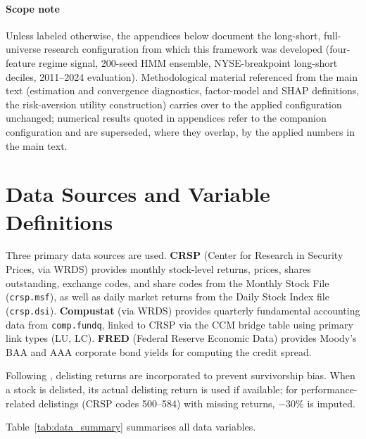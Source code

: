 
\paragraph*{Scope note}
Unless labeled otherwise, the appendices below document the long-short, full-universe research configuration from which this framework was developed (four-feature regime signal, 200-seed HMM ensemble, NYSE-breakpoint long-short deciles, 2011--2024 evaluation). Methodological material referenced from the main text (estimation and convergence diagnostics, factor-model and SHAP definitions, the risk-aversion utility construction) carries over to the applied configuration unchanged; numerical results quoted in appendices refer to the companion configuration and are superseded, where they overlap, by the applied numbers in the main text.

\section{Data Sources and Variable Definitions}\label{app:data_summary}

Three primary data sources are used. \textbf{CRSP} (Center for Research in Security Prices, via WRDS) provides monthly stock-level returns, prices, shares outstanding, exchange codes, and share codes from the Monthly Stock File (\texttt{crsp.msf}), as well as daily market returns from the Daily Stock Index file (\texttt{crsp.dsi}). \textbf{Compustat} (via WRDS) provides quarterly fundamental accounting data from \texttt{comp.fundq}, linked to CRSP via the CCM bridge table using primary link types (LU, LC). \textbf{FRED} (Federal Reserve Economic Data) provides Moody's BAA and AAA corporate bond yields for computing the credit spread.

Following \citet{Shumway1997}, delisting returns are incorporated to prevent survivorship bias. When a stock is delisted, its actual delisting return is used if available; for performance-related delistings (CRSP codes 500--584) with missing returns, $-30\%$ is imputed.

Table~\ref{tab:data_summary} summarises all data variables.

